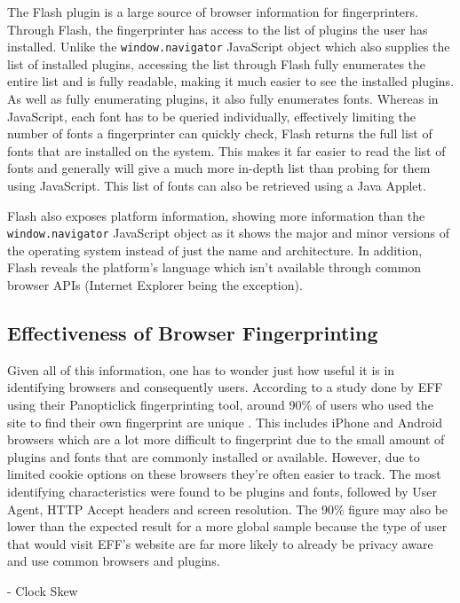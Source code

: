 The Flash plugin is a large source of browser information for fingerprinters.
Through Flash, the fingerprinter has access to the list of plugins the user has installed.
Unlike the \texttt{window.navigator} JavaScript object which also supplies the list of installed plugins, accessing the list through Flash fully enumerates the entire list and is fully readable, making it much easier to see the installed plugins.
As well as fully enumerating plugins, it also fully enumerates fonts.
Whereas in JavaScript, each font has to be queried individually, effectively limiting the number of fonts a fingerprinter can quickly check, Flash returns the full list of fonts that are installed on the system.
This makes it far easier to read the list of fonts and generally will give a much more in-depth list than probing for them using JavaScript.
This list of fonts can also be retrieved using a Java Applet.

Flash also exposes platform information, showing more information than the \texttt{window.navigator} JavaScript object as it shows the major and minor versions of the operating system instead of just the name and architecture.
In addition, Flash reveals the platform's language which isn't available through common browser APIs (Internet Explorer being the exception).

\subsection{Effectiveness of Browser Fingerprinting}

Given all of this information, one has to wonder just how useful it is in identifying browsers and consequently users.
According to a study done by EFF using their Panopticlick fingerprinting tool, around 90\% of users who used the site to find their own fingerprint are unique \citep{browser-uniqueness}.
This includes iPhone and Android browsers which are a lot more difficult to fingerprint due to the small amount of plugins and fonts that are commonly installed or available.
However, due to limited cookie options on these browsers they're often easier to track.
The most identifying characteristics were found to be plugins and fonts, followed by User Agent, HTTP Accept headers and screen resolution.
The 90\% figure may also be lower than the expected result for a more global sample because the type of user that would visit EFF's website are far more likely to already be privacy aware and use common browsers and plugins.

- Clock Skew

